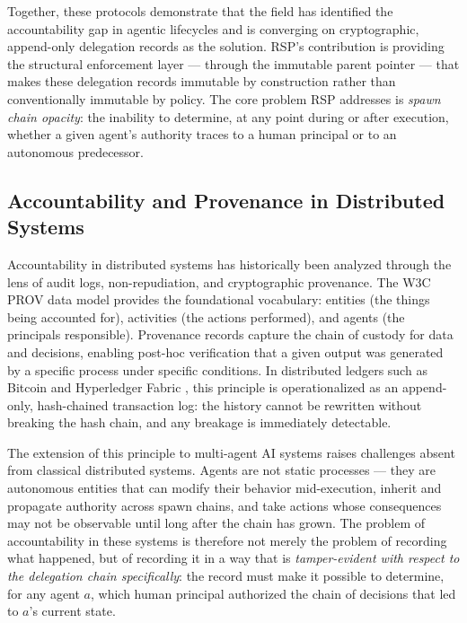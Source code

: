 Together, these protocols demonstrate that the field has identified the accountability gap in agentic lifecycles and is converging on cryptographic, append-only delegation records as the solution. RSP's contribution is providing the structural enforcement layer --- through the immutable parent pointer --- that makes these delegation records immutable by construction rather than conventionally immutable by policy. The core problem RSP addresses is \emph{spawn chain opacity}: the inability to determine, at any point during or after execution, whether a given agent's authority traces to a human principal or to an autonomous predecessor.

\subsection{Accountability and Provenance in Distributed Systems}

Accountability in distributed systems has historically been analyzed through the lens of audit logs, non-repudiation, and cryptographic provenance. The W3C PROV data model \cite{prov-standard} provides the foundational vocabulary: entities (the things being accounted for), activities (the actions performed), and agents (the principals responsible). Provenance records capture the chain of custody for data and decisions, enabling post-hoc verification that a given output was generated by a specific process under specific conditions. In distributed ledgers such as Bitcoin \cite{nakamoto2008bitcoin} and Hyperledger Fabric \cite{hyperledger2015}, this principle is operationalized as an append-only, hash-chained transaction log: the history cannot be rewritten without breaking the hash chain, and any breakage is immediately detectable.

The extension of this principle to multi-agent AI systems raises challenges absent from classical distributed systems. Agents are not static processes --- they are autonomous entities that can modify their behavior mid-execution, inherit and propagate authority across spawn chains, and take actions whose consequences may not be observable until long after the chain has grown. The problem of accountability in these systems is therefore not merely the problem of recording what happened, but of recording it in a way that is \emph{tamper-evident with respect to the delegation chain specifically}: the record must make it possible to determine, for any agent $a$, which human principal authorized the chain of decisions that led to $a$'s current state.

